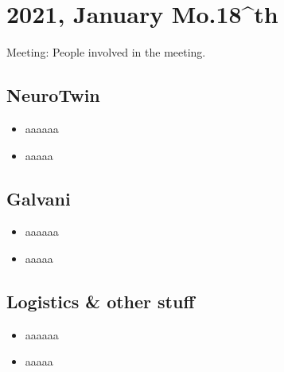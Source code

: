 
\section{2021, January Mo.18^{th}}


Meeting: People involved in the meeting.

\subsection{NeuroTwin}
\begin{itemize}
    \item aaaaaa
    \item aaaaa

\end{itemize}


\subsection{Galvani}
\begin{itemize}
    \item aaaaaa
    \item aaaaa

\end{itemize}

\subsection{Logistics \&  other stuff}
\begin{itemize}
    \item aaaaaa
    \item aaaaa

\end{itemize}


